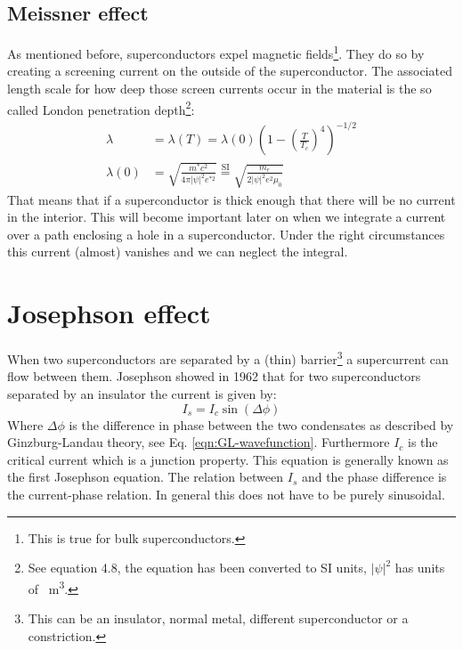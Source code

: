 \subsection{Meissner effect}
As mentioned before, superconductors expel magnetic fields\footnote{This is true for bulk superconductors.}. They do so by creating a screening current on the outside of the superconductor. The associated length scale for how deep those screen currents occur in the material is the so called London penetration depth\footnote{See  equation 4.8, the equation has been converted to SI units, $|\psi|^2$ has units of \unit{\per\cubic\meter}.}\cite{tinkhamIntroductionSuperconductivity}:
\begin{align}
	\lambda &= \lambda (T) = \lambda(0) \left(1 - \left(\frac{T}{T_c}\right)^4\right)^{-1/2} \nonumber \\
	\lambda(0) &= \sqrt{\frac{m^*c^2}{4\pi|\psi|^2e^{*2}}} \stackrel{\text{SI}}{=} \sqrt{\frac{m_e}{2|\psi|^2e^2\mu_0}}
	\label{eqn:london-penetration-depth}
\end{align}
That means that if a superconductor is thick enough that there will be no current in the interior. This will become important later on when we integrate a current over a path enclosing a hole in a superconductor. Under the right circumstances this current (almost) vanishes and we can neglect the integral.

\section{Josephson effect}
\label{sec:josephson-effect}
When two superconductors are separated by a (thin) barrier\footnote{This can be an insulator, normal metal, different superconductor or a constriction.} a supercurrent can flow between them. Josephson showed in 1962 that for two superconductors separated by an insulator the current is given by\cite{tinkhamIntroductionSuperconductivity}:
\begin{equation}
	I_s = I_c \sin(\Delta \phi)
\end{equation}
Where $\Delta \phi$ is the difference in phase between the two condensates as described by Ginzburg-Landau theory, see Eq. \ref{eqn:GL-wavefunction}. Furthermore $I_c$ is the critical current which is a junction property. This equation is generally known as the first Josephson equation. The relation between $I_s$ and the phase difference is the current-phase relation. In general this does not have to be purely sinusoidal\cite{golubovCurrentphaseRelationJosephson2004a}.

